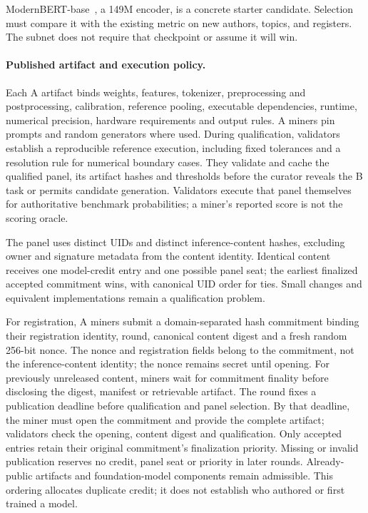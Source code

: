 ModernBERT-base~\cite{modernbert},
a 149M encoder, is a concrete starter candidate. Selection must compare
it with the existing metric on new authors, topics, and registers. The
subnet does not require that checkpoint or assume it will win.

\paragraph{Published artifact and execution policy.}\label{a-artifact-execution}
Each A artifact binds weights, features, tokenizer, preprocessing and
postprocessing, calibration, reference pooling, executable dependencies,
runtime, numerical precision, hardware requirements and output rules.
A miners pin prompts and random generators where used. During qualification,
validators establish a reproducible reference execution, including fixed
tolerances and a resolution rule for numerical boundary cases. They validate and cache the
qualified panel, its artifact hashes and thresholds before the curator
reveals the B task or permits candidate generation. Validators execute
that panel themselves for authoritative benchmark probabilities; a miner's
reported score is not the scoring oracle.

The panel uses distinct UIDs and distinct inference-content hashes,
excluding owner and signature metadata from the content identity. Identical
content receives one model-credit entry and one possible panel seat; the
earliest finalized accepted commitment wins, with canonical UID order for
ties. Small changes and equivalent implementations remain a qualification
problem.

For registration, A miners submit a domain-separated hash commitment
binding their registration identity, round, canonical content digest and a
fresh random 256-bit nonce. The nonce and registration fields belong to
the commitment, not the inference-content identity; the nonce remains
secret until opening. For previously
unreleased content, miners wait for commitment finality before disclosing
the digest, manifest or retrievable artifact. The round fixes a publication
deadline before qualification and panel selection. By that deadline, the
miner must open the commitment and provide the complete artifact;
validators check the opening, content digest and qualification. Only
accepted entries retain their original commitment's finalization priority.
Missing or invalid publication reserves no credit, panel seat or priority
in later rounds. Already-public artifacts and foundation-model components
remain admissible. This ordering allocates duplicate credit; it does not
establish who authored or first trained a model.

